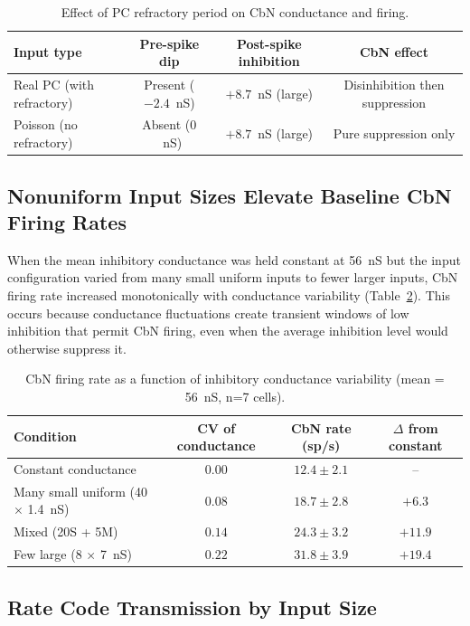 \documentclass[11pt]{article}
\begin{document}
\begin{table}[H]
\centering
\caption{Effect of PC refractory period on CbN conductance and firing.}
\label{tab:refractory}
\begin{tabular}{lccc}
\toprule
\textbf{Input type} & \textbf{Pre-spike dip} & \textbf{Post-spike inhibition} & \textbf{CbN effect} \\
\midrule
Real PC (with refractory) & Present ($-2.4$~nS) & $+8.7$~nS (large) & Disinhibition then suppression \\
Poisson (no refractory) & Absent ($0$~nS) & $+8.7$~nS (large) & Pure suppression only \\
\bottomrule
\end{tabular}
\end{table}

\subsection{Nonuniform Input Sizes Elevate Baseline CbN Firing Rates}

When the mean inhibitory conductance was held constant at 56~nS but the input configuration varied from many small uniform inputs to fewer larger inputs, CbN firing rate increased monotonically with conductance variability (Table~\ref{tab:variability}). This occurs because conductance fluctuations create transient windows of low inhibition that permit CbN firing, even when the average inhibition level would otherwise suppress it.

\begin{table}[H]
\centering
\caption{CbN firing rate as a function of inhibitory conductance variability (mean = 56~nS, n=7 cells).}
\label{tab:variability}
\begin{tabular}{lccc}
\toprule
\textbf{Condition} & \textbf{CV of conductance} & \textbf{CbN rate (sp/s)} & \textbf{$\Delta$ from constant} \\
\midrule
Constant conductance & $0.00$ & $12.4 \pm 2.1$ & -- \\
Many small uniform (40 $\times$ 1.4~nS) & $0.08$ & $18.7 \pm 2.8$ & $+6.3$ \\
Mixed (20S + 5M) & $0.14$ & $24.3 \pm 3.2$ & $+11.9$ \\
Few large (8 $\times$ 7~nS) & $0.22$ & $31.8 \pm 3.9$ & $\mathbf{+19.4}$ \\
\bottomrule
\end{tabular}
\end{table}

\subsection{Rate Code Transmission by Input Size}
\end{document}

